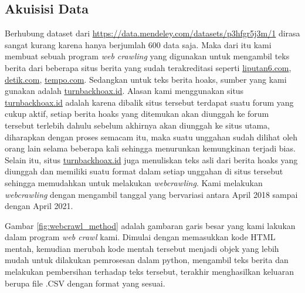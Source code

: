 \subsection{Akuisisi Data}
Berhubung dataset dari \url{https://data.mendeley.com/datasets/p3hfgr5j3m/1} dirasa sangat kurang karena hanya berjumlah 600 data saja. Maka dari itu kami membuat sebuah program \textit{web crawling} yang digunakan untuk mengambil teks berita dari beberapa situs berita yang sudah terakreditasi seperti \url{liputan6.com}, \url{detik.com}, \url{tempo.com}. Sedangkan untuk teks berita hoaks, sumber yang kami gunakan adalah \url{turnbackhoax.id}. Alasan kami menggunakan situs \url{turnbackhoax.id} adalah karena dibalik situs tersebut terdapat suatu forum yang cukup aktif, setiap berita hoaks yang ditemukan akan diunggah ke forum tersebut terlebih dahulu sebelum akhirnya akan diunggah ke situs utama, diharapkan dengan proses semacam itu, maka suatu unggahan sudah dilihat oleh orang lain selama beberapa kali sehingga menurunkan kemungkinan terjadi bias. Selain itu, situs \url{turnbackhoax.id} juga menuliskan teks asli dari berita hoaks yang diunggah dan memiliki suatu format dalam setiap unggahan di situs tersebut sehingga memudahkan untuk melakukan \textit{webcrawling}. Kami melakukan \textit{webcrawling} dengan mengambil tanggal yang bervariasi antara April 2018 sampai dengan April 2021.

Gambar \ref{fig:webcrawl_method} adalah gambaran garis besar yang kami lakukan dalam program \textit{web crawl} kami. Dimulai dengan memasukkan kode HTML mentah, kemudian merubah kode mentah tersebut menjadi objek yang lebih mudah untuk dilakukan pemrosesan dalam python, mengambil teks berita dan melakukan pembersihan terhadap teks tersebut, terakhir menghasilkan keluaran berupa file .CSV dengan format yang sesuai.

